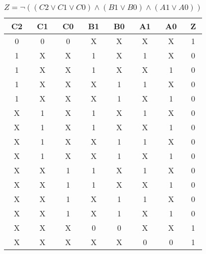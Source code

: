 \begin{center}
    \begin{table}[h] \caption{\(Z = \lnot ((C2 \lor C1 \lor C0) \land (B1 \lor B0) \land (A1 \lor A0)) \)}
        \begin{center}
            \begin{tabular}{|c|c|c|c|c|c|c||c|} \hline
            C2 & C1 & C0 & B1 & B0 & A1 & A0 & Z \\ \hline\hline
            0  & 0  & 0  & X  & X  & X  & X  & 1 \\ \hline
            1  & X  & X  & 1  & X  & 1  & X  & 0 \\ \hline
            1  & X  & X  & 1  & X  & X  & 1  & 0 \\ \hline
            1  & X  & X  & X  & 1  & 1  & X  & 0 \\ \hline
            1  & X  & X  & X  & 1  & X  & 1  & 0 \\ \hline
            X  & 1  & X  & 1  & X  & 1  & X  & 0 \\ \hline
            X  & 1  & X  & 1  & X  & X  & 1  & 0 \\ \hline
            X  & 1  & X  & X  & 1  & 1  & X  & 0 \\ \hline
            X  & 1  & X  & X  & 1  & X  & 1  & 0 \\ \hline
            X  & X  & 1  & 1  & X  & 1  & X  & 0 \\ \hline
            X  & X  & 1  & 1  & X  & X  & 1  & 0 \\ \hline
            X  & X  & 1  & X  & 1  & 1  & X  & 0 \\ \hline
            X  & X  & 1  & X  & 1  & X  & 1  & 0 \\ \hline
            X  & X  & X  & 0  & 0  & X  & X  & 1 \\ \hline
            X  & X  & X  & X  & X  & 0  & 0  & 1 \\ \hline
            \end{tabular}
        \end{center}
    \end{table}
\end{center}
